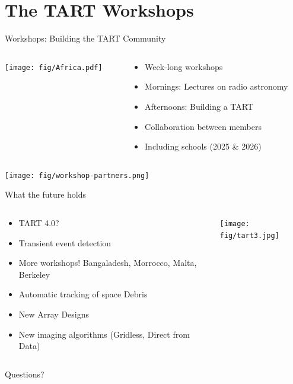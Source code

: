 \documentclass[ignorenonframetext]{beamer}
\begin{document}
\section{The TART Workshops}

\frame{\tableofcontents[currentsection]}

\begin{frame}{Workshops: Building the TART Community}
 \begin{columns}
  \begin{column}{0.4\linewidth}
\texttt{[image: fig/Africa.pdf]}
  \end{column}
  \begin{column}{0.6\linewidth}
  \begin{itemize}
   \item Week-long workshops
   \item Mornings: Lectures on radio astronomy
   \item Afternoons: Building a TART
   \item Collaboration between members
   \item Including schools (2025 \& 2026)
  \end{itemize}
\end{column}
 \end{columns} 
 \centering
   \texttt{[image: fig/workshop-partners.png]}
\end{frame}



\begin{frame}{What the future holds}
 \begin{columns}
  \begin{column}{0.6\linewidth}
    \begin{itemize}
    \item TART 4.0?
    \item Transient event detection
    \item More workshops! Bangaladesh, Morrocco, Malta, Berkeley
    \item Automatic tracking of space Debris
    \item New Array Designs
    \item New imaging algorithms (Gridless, Direct from Data)
    \end{itemize}
  \end{column}
  \begin{column}{0.4\linewidth}
    \texttt{[image: fig/tart3.jpg]}
  \end{column}
\end{columns}
    \pause
    \begin{block}{}
     \begin{center} Questions? \end{center}
    \end{block}

\end{frame}
\end{document}
